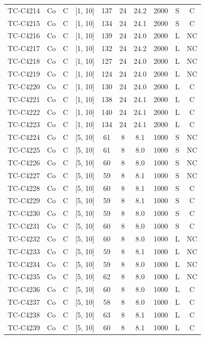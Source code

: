 \begin{longtable}{lccccccccc}
TC-C4214 & Co & C & [1, 10] & 137 & 24 & 24.2 & 2000 & S & C \\
TC-C4215 & Co & C & [1, 10] & 134 & 24 & 24.1 & 2000 & S & C \\
TC-C4216 & Co & C & [1, 10] & 139 & 24 & 24.0 & 2000 & L & NC \\
TC-C4217 & Co & C & [1, 10] & 132 & 24 & 24.2 & 2000 & L & NC \\
TC-C4218 & Co & C & [1, 10] & 127 & 24 & 24.0 & 2000 & L & NC \\
TC-C4219 & Co & C & [1, 10] & 124 & 24 & 24.0 & 2000 & L & NC \\
TC-C4220 & Co & C & [1, 10] & 130 & 24 & 24.0 & 2000 & L & C \\
TC-C4221 & Co & C & [1, 10] & 138 & 24 & 24.1 & 2000 & L & C \\
TC-C4222 & Co & C & [1, 10] & 140 & 24 & 24.1 & 2000 & L & C \\
TC-C4223 & Co & C & [1, 10] & 134 & 24 & 24.1 & 2000 & L & C \\
TC-C4224 & Co & C & [5, 10] & 61 & 8 & 8.1 & 1000 & S & NC \\
TC-C4225 & Co & C & [5, 10] & 61 & 8 & 8.0 & 1000 & S & NC \\
TC-C4226 & Co & C & [5, 10] & 60 & 8 & 8.0 & 1000 & S & NC \\
TC-C4227 & Co & C & [5, 10] & 59 & 8 & 8.1 & 1000 & S & NC \\
TC-C4228 & Co & C & [5, 10] & 60 & 8 & 8.1 & 1000 & S & C \\
TC-C4229 & Co & C & [5, 10] & 59 & 8 & 8.1 & 1000 & S & C \\
TC-C4230 & Co & C & [5, 10] & 59 & 8 & 8.0 & 1000 & S & C \\
TC-C4231 & Co & C & [5, 10] & 60 & 8 & 8.0 & 1000 & S & C \\
TC-C4232 & Co & C & [5, 10] & 60 & 8 & 8.0 & 1000 & L & NC \\
TC-C4233 & Co & C & [5, 10] & 59 & 8 & 8.1 & 1000 & L & NC \\
TC-C4234 & Co & C & [5, 10] & 59 & 8 & 8.0 & 1000 & L & NC \\
TC-C4235 & Co & C & [5, 10] & 62 & 8 & 8.0 & 1000 & L & NC \\
TC-C4236 & Co & C & [5, 10] & 60 & 8 & 8.0 & 1000 & L & C \\
TC-C4237 & Co & C & [5, 10] & 58 & 8 & 8.0 & 1000 & L & C \\
TC-C4238 & Co & C & [5, 10] & 63 & 8 & 8.1 & 1000 & L & C \\
TC-C4239 & Co & C & [5, 10] & 60 & 8 & 8.1 & 1000 & L & C \\

\end{longtable}
